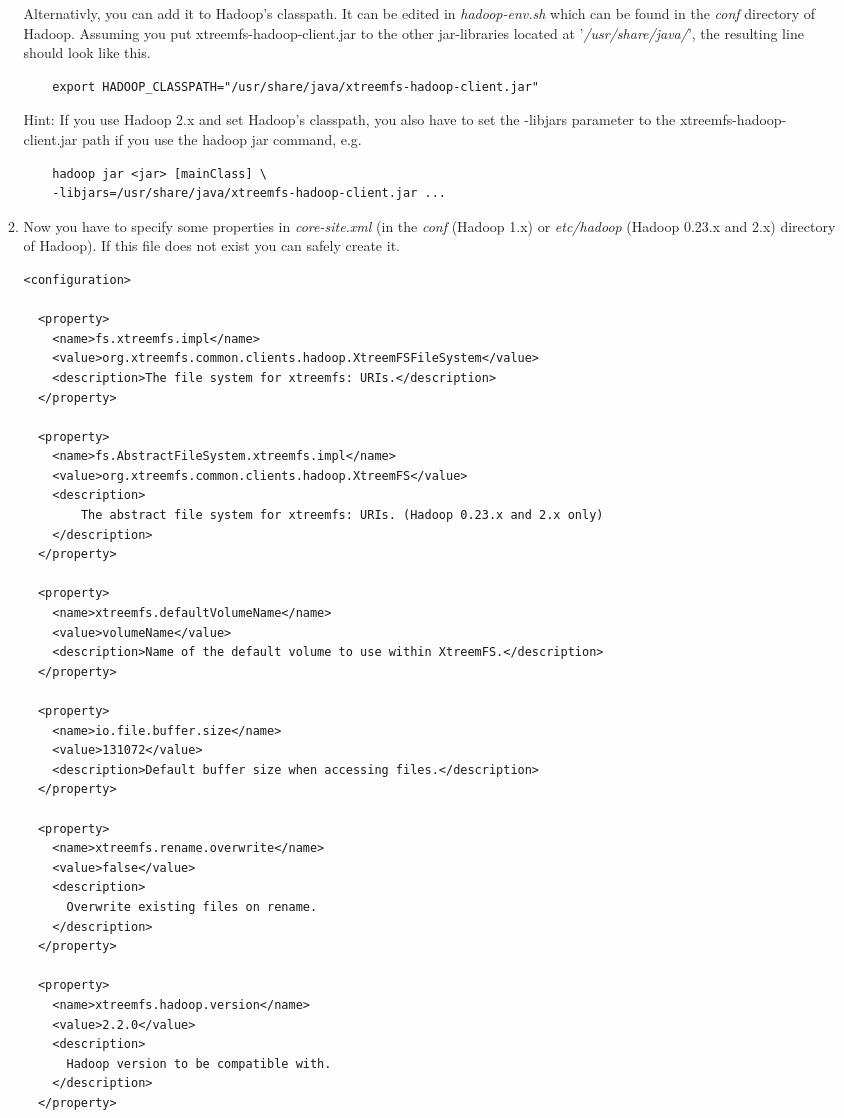 \documentclass[a4paper,10pt]{book}
\begin{document}
\begin{enumerate}
\begin{enumerate}
	Alternativly, you can add it to Hadoop's classpath. It can be edited in \textit{hadoop-env.sh} which can be found in the \textit{conf} directory of Hadoop. Assuming you put xtreemfs-hadoop-client.jar to the other jar-libraries located at '\textit{/usr/share/java/}', the resulting line should look like this.
	\begin{verbatim}
	export HADOOP_CLASSPATH="/usr/share/java/xtreemfs-hadoop-client.jar"
	\end{verbatim}
Hint: If you use Hadoop 2.x and set Hadoop's classpath, you also have to set the -libjars parameter to the xtreemfs-hadoop-client.jar path if you use the hadoop jar command, e.g.
    \begin{verbatim}
	hadoop jar <jar> [mainClass] \
	-libjars=/usr/share/java/xtreemfs-hadoop-client.jar ...
    \end{verbatim}
	\item Now you have to specify some properties in \textit{core-site.xml} (in the \textit{conf} (Hadoop 1.x) or \textit{etc/hadoop} (Hadoop 0.23.x and 2.x)
	directory of Hadoop). If this file does not exist you can safely create it.
	\begin{verbatim}
<configuration>

  <property>
    <name>fs.xtreemfs.impl</name>
    <value>org.xtreemfs.common.clients.hadoop.XtreemFSFileSystem</value>
    <description>The file system for xtreemfs: URIs.</description>
  </property>

  <property>
    <name>fs.AbstractFileSystem.xtreemfs.impl</name>
    <value>org.xtreemfs.common.clients.hadoop.XtreemFS</value>
    <description>
        The abstract file system for xtreemfs: URIs. (Hadoop 0.23.x and 2.x only)
    </description>
  </property>
  
  <property>
    <name>xtreemfs.defaultVolumeName</name>
    <value>volumeName</value>
    <description>Name of the default volume to use within XtreemFS.</description>
  </property>

  <property>
    <name>io.file.buffer.size</name>
    <value>131072</value>
    <description>Default buffer size when accessing files.</description>
  </property>
  
  <property>
    <name>xtreemfs.rename.overwrite</name>
    <value>false</value>
    <description>
      Overwrite existing files on rename.
    </description>
  </property>
  
  <property>
    <name>xtreemfs.hadoop.version</name>
    <value>2.2.0</value>
    <description>
      Hadoop version to be compatible with.
    </description>
  </property>


\end{verbatim}
\end{enumerate}
\end{enumerate}
\end{document}
